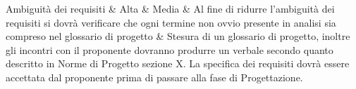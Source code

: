 				   Ambiguità dei requisiti & Alta & Media & Al fine di ridurre l'ambiguità dei requisiti si dovrà verificare che ogni termine non ovvio presente in analisi sia compreso nel glossario di progetto & Stesura di un glossario di progetto, inoltre gli incontri con il proponente dovranno produrre un verbale secondo quanto descritto in Norme di Progetto sezione X. La specifica dei requisiti dovrà essere accettata dal proponente prima di passare alla fase di Progettazione. \\
				   